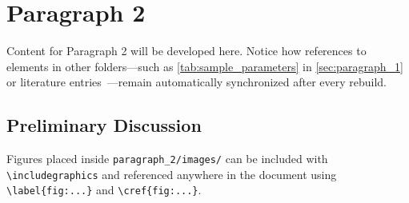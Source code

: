 \section{Paragraph 2}
\label{sec:paragraph_2}

Content for Paragraph 2 will be developed here. Notice how references to
elements in other folders—such as \cref{tab:sample_parameters} in
\cref{sec:paragraph_1} or literature entries~\cite{hein2012world}—remain
automatically synchronized after every rebuild.

\subsection{Preliminary Discussion}
\label{subsec:discussion}

Figures placed inside \texttt{paragraph\_2/images/} can be included with
\texttt{\textbackslash includegraphics} and referenced anywhere in the document
using \texttt{\textbackslash label\{fig:...\}} and \texttt{\textbackslash cref\{fig:...\}}.
